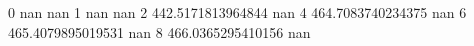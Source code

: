 0 nan nan
1 nan nan
2 442.5171813964844 nan
4 464.7083740234375 nan
6 465.4079895019531 nan
8 466.0365295410156 nan
